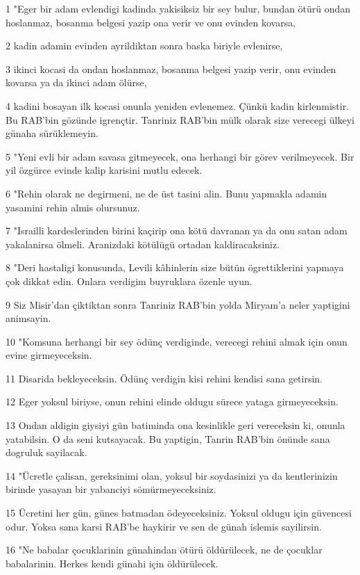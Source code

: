 \par 1 "Eger bir adam evlendigi kadinda yakisiksiz bir sey bulur, bundan ötürü ondan hoslanmaz, bosanma belgesi yazip ona verir ve onu evinden kovarsa,
\par 2 kadin adamin evinden ayrildiktan sonra baska biriyle evlenirse,
\par 3 ikinci kocasi da ondan hoslanmaz, bosanma belgesi yazip verir, onu evinden kovarsa ya da ikinci adam ölürse,
\par 4 kadini bosayan ilk kocasi onunla yeniden evlenemez. Çünkü kadin kirlenmistir. Bu RAB'bin gözünde igrençtir. Tanriniz RAB'bin mülk olarak size verecegi ülkeyi günaha sürüklemeyin.
\par 5 "Yeni evli bir adam savasa gitmeyecek, ona herhangi bir görev verilmeyecek. Bir yil özgürce evinde kalip karisini mutlu edecek.
\par 6 "Rehin olarak ne degirmeni, ne de üst tasini alin. Bunu yapmakla adamin yasamini rehin almis olursunuz.
\par 7 "Israilli kardeslerinden birini kaçirip ona kötü davranan ya da onu satan adam yakalanirsa ölmeli. Aranizdaki kötülügü ortadan kaldiracaksiniz.
\par 8 "Deri hastaligi konusunda, Levili kâhinlerin size bütün ögrettiklerini yapmaya çok dikkat edin. Onlara verdigim buyruklara özenle uyun.
\par 9 Siz Misir'dan çiktiktan sonra Tanriniz RAB'bin yolda Miryam'a neler yaptigini animsayin.
\par 10 "Komsuna herhangi bir sey ödünç verdiginde, verecegi rehini almak için onun evine girmeyeceksin.
\par 11 Disarida bekleyeceksin. Ödünç verdigin kisi rehini kendisi sana getirsin.
\par 12 Eger yoksul biriyse, onun rehini elinde oldugu sürece yataga girmeyeceksin.
\par 13 Ondan aldigin giysiyi gün batiminda ona kesinlikle geri vereceksin ki, onunla yatabilsin. O da seni kutsayacak. Bu yaptigin, Tanrin RAB'bin önünde sana dogruluk sayilacak.
\par 14 "Ücretle çalisan, gereksinimi olan, yoksul bir soydasinizi ya da kentlerinizin birinde yasayan bir yabanciyi sömürmeyeceksiniz.
\par 15 Ücretini her gün, günes batmadan ödeyeceksiniz. Yoksul oldugu için güvencesi odur. Yoksa sana karsi RAB'be haykirir ve sen de günah islemis sayilirsin.
\par 16 "Ne babalar çocuklarinin günahindan ötürü öldürülecek, ne de çocuklar babalarinin. Herkes kendi günahi için öldürülecek.
